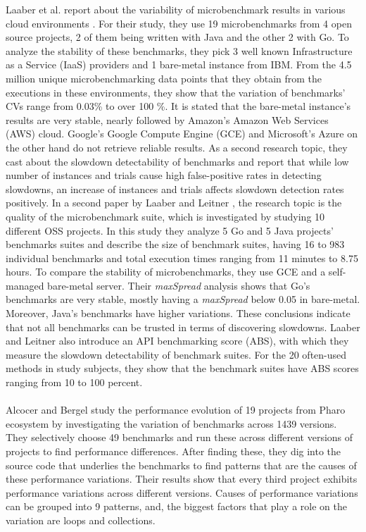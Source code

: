 \documentclass{seal_thesis}
\begin{document}
Laaber et al. report about the variability of microbenchmark results in various cloud environments \cite{laaber2019software}. For their study, they use 19 microbenchmarks from 4 open source projects, 2 of them being written with Java and the other 2 with Go. To analyze the stability of these benchmarks, they pick 3 well known Infrastructure as a Service (IaaS) providers and 1 bare-metal instance from IBM. From the 4.5 million unique microbenchmarking data points that they obtain from the executions in these environments, they show that the variation of benchmarks' CVs range from 0.03\% to over 100 \%. It is stated that the bare-metal instance's results are very stable, nearly followed by Amazon's Amazon Web Services (AWS) cloud. Google's Google Compute Engine (GCE) and Microsoft's Azure on the other hand do not retrieve reliable results. As a second research topic, they cast about the slowdown detectability of benchmarks and report that while low number of instances and trials cause high false-positive rates in detecting slowdowns, an increase of instances and trials affects slowdown detection rates positively. In a second paper by Laaber and Leitner \cite{Laaber:2018:EOS:3196398.3196407}, the research topic is the quality of the microbenchmark suite, which is investigated by studying 10 different OSS projects. In this study they analyze 5 Go and 5 Java projects' benchmarks suites and describe the size of benchmark suites, having 16 to 983 individual benchmarks and total execution times ranging from 11 minutes to 8.75 hours. To compare the stability of microbenchmarks, they use GCE and a self-managed bare-metal server. Their \textit{maxSpread} analysis shows that Go's benchmarks are very stable, mostly having a \textit{maxSpread} below 0.05 in bare-metal. Moreover, Java's benchmarks have higher variations. These conclusions indicate that not all benchmarks can be trusted in terms of discovering slowdowns. Laaber and Leitner also introduce an API benchmarking score (ABS), with which they measure the slowdown detectability of benchmark suites. For the 20 often-used methods in study subjects, they show that the benchmark suites have ABS scores ranging from 10 to 100 percent.\\
\\
Alcocer and Bergel \cite{Alcocer:2015:TDP:2816707.2816718} study the performance evolution of 19 projects from Pharo ecosystem by investigating the variation of benchmarks across 1439 versions. They selectively choose 49 benchmarks and 
run these across different versions of projects to find performance differences. After finding these, they dig into the source code that underlies the benchmarks to find patterns that are the causes of these performance variations. Their results show that every third project exhibits performance variations across different versions. Causes of performance variations can be grouped into 9 patterns, and, the biggest factors that play a role on the variation are loops and collections.\\
\end{document}
